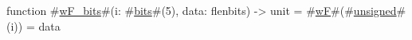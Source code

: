 function #\hyperref[sailRISCVzwFzybits]{wF\_bits}#(i: #\hyperref[sailRISCVzbits]{bits}#(5), data: flenbits) -> unit = {
  #\hyperref[sailRISCVzwF]{wF}#(#\hyperref[sailRISCVzunsigned]{unsigned}#(i)) = data
}

